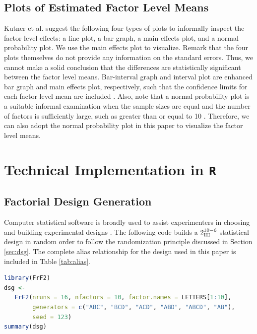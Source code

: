 \documentclass[11pt]{article}
\begin{document}
\subsection{Plots of Estimated Factor Level Means}\label{sec:plots}
Kutner et al. \cite{bk:dae1} suggest the following four types of plots to informally inspect the factor level effects: a line plot, a bar graph, a main effects plot, and a normal probability plot. We use the main effects plot to visualize. Remark that the four plots themselves do not provide any information on the standard errors. Thus, we cannot make a solid conclusion that the differences are statistically significant between the factor level means. Bar-interval graph and interval plot are enhanced bar graph and main effects plot, respectively, such that the confidence limits for each factor level mean are included \cite{bk:dae1}. Also, note that a normal probability plot is a suitable informal examination when the sample sizes are equal and the number of factors is sufficiently large, such as greater than or equal to 10 \cite{bk:dae1}. Therefore, we can also adopt the normal probability plot in this paper to visualize the factor level means.

\appendix
\section{Technical Implementation in \texttt{R}}\label{sec:app}

\subsection{Factorial Design Generation}\label{app:fdg}
Computer statistical software is broadly used to assist experimenters in choosing and building experimental designs \cite{bk:dae2}. The following code builds a $2^{10-6}_{\text{\MakeUppercase{\romannumeral 3}}}$ statistical design in random order to follow the randomization principle discussed in Section \ref{sec:dsg}. The complete alias relationship for the design used in this paper is included in Table \ref{tab:alias}.
\begin{file}[dae.r]
\begin{lstlisting}[language = R]
library(FrF2)
dsg <- 
   FrF2(nruns = 16, nfactors = 10, factor.names = LETTERS[1:10],
        generators = c("ABC", "BCD", "ACD", "ABD", "ABCD", "AB"), 
        seed = 123)
summary(dsg)
\end{lstlisting}
\end{file}
\end{document}
